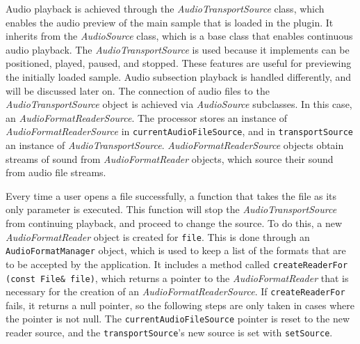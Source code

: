 \documentclass[12pt, a4paper, hidelinks]{report}
\begin{document}
	
	Audio playback is achieved through the \textit{AudioTransportSource} class, which enables the audio preview of the main sample that is loaded in the plugin. It inherits from the \textit{AudioSource} class, which is a base class that enables continuous audio playback. The \textit{AudioTransportSource} is used because it implements can be positioned, played, paused, and stopped. These features are useful for previewing the initially loaded sample. Audio subsection playback is handled differently, and will be discussed later on. The connection of audio files to the \textit{AudioTransportSource} object is achieved via \textit{AudioSource} subclasses. In this case, an \textit{AudioFormatReaderSource}. The processor stores an instance of \textit{AudioFormatReaderSource} in \texttt{currentAudioFileSource}, and in \texttt{transportSource} an instance of \textit{AudioTransportSource}. \textit{AudioFormatReaderSource} objects obtain streams of sound from \textit{AudioFormatReader} objects, which source their sound from audio file streams. \par 
	Every time a user opens a file successfully, a function that takes the file as its only parameter is executed. This function will stop the \textit{AudioTransportSource} from continuing playback, and proceed to change the source. To do this, a new \textit{AudioFormatReader} object is created for \texttt{file}. This is done through an \texttt{AudioFormatManager} object, which is used to keep a list of the formats that are to be accepted by the application. It includes a method called \texttt{createReaderFor (const File\& file)}, which returns a pointer to the \textit{AudioFormatReader} that is necessary for the creation of an \textit{AudioFormatReaderSource}. If \texttt{createReaderFor} fails, it returns a null pointer, so the following steps are only taken in cases where the pointer is not null. The \texttt{currentAudioFileSource} pointer is reset to the new reader source, and the \texttt{transportSource}'s new source is set with \texttt{setSource}.\\
\end{document}
